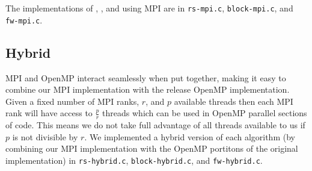 The implementations of \rs{}, \block{}, and \fw{} using MPI are in
\texttt{rs-mpi.c}, \texttt{block-mpi.c}, and \texttt{fw-mpi.c}.

\subsection{Hybrid}
MPI and OpenMP interact seamlessly when put together, making it easy to combine
our MPI implementation with the release OpenMP implementation. Given a fixed
number of MPI ranks, $r$, and $p$ available threads then each MPI rank will
have access to $\frac{p}{r}$ threads which can be used in OpenMP parallel
sections of code. This means we do not take full advantage of all threads
available to us if $p$ is not divisible by $r$. We implemented a hybrid version
of each algorithm (by combining our MPI implementation with the OpenMP
portitons of the original implementation) in \texttt{rs-hybrid.c},
\texttt{block-hybrid.c}, and \texttt {fw-hybrid.c}.
